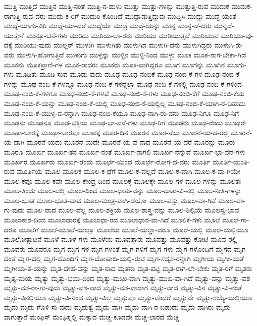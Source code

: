 {ಮುತ್ತಿ
ಮುತ್ತಿದೆ
ಮುತ್ತಿನ
ಮುತ್ತಿ-ನಂತೆ
ಮುತ್ತಿ-ನ-ಹುಳು
ಮುತ್ತು
ಮುತ್ತು-ಗಳನ್ನು
ಮುತ್ತುತ್ತಿ-ರುವ
ಮುದುಕ
ಮುದುಕ-ರಾಗುತ್ತಿ-ರುವ-ವರು
ಮುದು-ಕ-ರಿಗೆ
ಮುದುರಿ-ಕೊಂಡಿದೆ
ಮುದ್ದಾಡುತ್ತಿದ್ದುವು
ಮುದ್ದಿಸಿ
ಮುದ್ದು
ಮುದ್ದೆ-ಯಂತೆ
ಮುದ್ದೆ-ಯಾಗು-ವಿರಿ
ಮುದ್ದೆ-ಯಾ-ದರೆ
ಮುದ್ದೆಯೇ
ಮುದ್ರೆ
ಮುದ್ರೆ-ಯನ್ನು
ಮುನ್ನ
ಮುನ್ನ-ಡೆ-ದರು
ಮುನ್ನಡೆ-ಯುತ್ತೇನೆ
ಮುನ್ಸೂ-ಚನೆ-ಗಳು
ಮುರಿದು
ಮುರಿಯ-ಲಾ-ರರು
ಮುರಿಯು
ಮುರಿಯುತ್ತದೆ
ಮುರಿಯುವ
ಮುರಿಯು-ವು-ದಕ್ಕೆ
ಮುರಿಯು-ವುದು
ಮುಲ್ಲರ್
ಮುಳುಗಿ
ಮುಳುಗಿತು
ಮುಳುಗಿದ
ಮುಳುಗಿ-ದನು
ಮುಳುಗಿದ್ದರು
ಮುಳುಗಿ-ರು-ವರು
ಮುಳುಗಿ-ಹೋಗುತ್ತಿದೆ
ಮುಳುಗು
ಮುಳ್ಳನ್ನು
ಮುಳ್ಳಿನ
ಮುಳ್ಳಿ-ನಿಂದ
ಮುಳ್ಳು
ಮೂಕ
ಮೂಕ-ನಾಗ-ಬೇಕಾ-ಗಿದೆ
ಮೂಕನು
ಮೂಕಪ್ರಾಣಿ-ಗಳ
ಮೂಕ-ರಾದರು
ಮೂಕರು
ಮೂಕ-ವಾಗಿದ್ದರೂ
ಮೂಗ
ಮೂಗನ್ನು
ಮೂಗಿನ
ಮೂಗು-ಗಳು
ಮೂಡಿತು
ಮೂಡಿ-ಸುವ
ಮೂಡು-ವುದು
ಮೂಢ
ಮೂಢ-ನಂಬಿಕೆ
ಮೂಢ-ನಂಬಿ-ಕೆ-ಗಳ
ಮೂಢ-ನಂಬಿ-ಕೆ-ಗಳನ್ನು
ಮೂಢ-ನಂಬಿ-ಕೆ-ಗಳನ್ನೂ
ಮೂಢ-ನಂಬಿ-ಕೆ-ಗಳನ್ನೆಲ್ಲಾ
ಮೂಢ-ನಂಬಿ-ಕೆ-ಗಳಲ್ಲಿ
ಮೂಢ-ನಂಬಿ-ಕೆ-ಗಳಿಂದ
ಮೂಢ-ನಂಬಿ-ಕೆ-ಗಳಿಗೂ
ಮೂಢ-ನಂಬಿ-ಕೆ-ಗಳಿವೆ
ಮೂಢ-ನಂಬಿ-ಕೆ-ಗಳು
ಮೂಢ-ನಂಬಿ-ಕೆಗೆ
ಮೂಢ-ನಂಬಿ-ಕೆಯ
ಮೂಢ-ನಂಬಿ-ಕೆ-ಯನ್ನು
ಮೂಢ-ನಂಬಿ-ಕೆ-ಯಲ್ಲಿ
ಮೂಢ-ನಂಬಿ-ಕೆ-ಯಲ್ಲಿಲ್ಲ
ಮೂಢ-ನಂಬಿ-ಕೆ-ಯಾಗಿ-ರ-ಬಹುದು
ಮೂಢ-ನಂಬಿ-ಕೆ-ಯುಳ್ಳ-ವ-ರನ್ನಾಗಿ
ಮೂಢ-ನಂಬಿ-ಕೆಯೂ
ಮೂಢ-ನಾಗಿ-ರು-ವನು
ಮೂಢ-ನಿಗೂ
ಮೂಢ-ನಿಗೆ
ಮೂಢನು
ಮೂಢನೂ
ಮೂಢ-ಭಕ್ತಿಯ
ಮೂಢ-ಭಾ-ವನೆ-ಗಳು
ಮೂಢ-ರಿಗೆ
ಮೂಢರು
ಮೂಢ-ರೆಂದು
ಮೂಢರೇ
ಮೂಢಾ-ಚಾರಕ್ಕೆ
ಮೂಢಾ-ಚಾರವೂ
ಮೂರಕ್ಕೆ
ಮೂರ-ದಿನ
ಮೂರನೆ
ಮೂರ-ನೆಯ
ಮೂರನೆ-ಯ-ದ-ರಲ್ಲಿ
ಮೂರನೆ-ಯ-ದಾಗಿ
ಮೂರನೆ-ಯದು
ಮೂರನೆ-ಯದೇ
ಮೂರನೆ-ಯ-ವ-ನಾದ
ಮೂರನೆ-ಯ-ವರೆ
ಮೂರನ್ನು
ಮೂರು
ಮೂರೂ
ಮೂರ್ಖ
ಮೂರ್ಖ-ತನ
ಮೂರ್ಖ-ನಂತೆ
ಮೂರ್ಖ-ನಾಗಲಿ
ಮೂರ್ಖ-ನೆನ್ನುವೆ
ಮೂರ್ಖ-ಭಾ-ವನೆ-ಗಳು
ಮೂರ್ಖರ
ಮೂರ್ಖರು
ಮೂರ್ಖ-ರೆಂದು
ಮೂರ್ಛೆ-ಯಿಂದ
ಮೂರ್ಛೆ-ರೋಗ-ದ-ವರು
ಮೂರ್ತಿ
ಮೂರ್ತಿ-ಯಂತಿ-ರುವ
ಮೂರ್ತಿಯೆ
ಮೂಲ
ಮೂಲಕ
ಮೂಲ-ಕ-ಥೆಗೆ
ಮೂಲ-ಕ-ವಲ್ಲದೆ
ಮೂಲ-ಕ-ವಾಗಿ
ಮೂಲ-ಕ-ವಾ-ಗಿಯೇ
ಮೂಲ-ಕವೂ
ಮೂಲ-ಕವೇ
ಮೂಲ-ಕೇಂದ್ರ-ದಿಂದ
ಮೂಲಕ್ಕೆ
ಮೂಲಕ್ಕೇ
ಮೂಲ-ಗಳ
ಮೂಲ-ಗಳನ್ನು
ಮೂಲತಃ
ಮೂಲ-ತಿಂದು
ಮೂಲ-ದಲ್ಲಿ
ಮೂಲ-ದಿಂದ
ಮೂಲ-ಧಾತು-ವನ್ನು
ಮೂಲ-ಧಾತು-ವಿ-ನಲ್ಲಿ
ಮೂಲ-ನೀತಿ-ಗಳನ್ನು
ಮೂಲ-ಭೂತ
ಮೂಲ-ಭೂತ-ವಾದ
ಮೂಲ-ಮಂತ್ರ-ವಾಗಿ-ದೆಯೋ
ಮೂಲ-ವಸ್ತು
ಮೂಲ-ವಾ-ಗಿವೆ
ಮೂಲ-ವಾ-ಗು-ವುದು
ಮೂಲ-ವಾದ
ಮೂಲ-ವೆಲ್ಲ
ಮೂಲ-ಶಕ್ತಿಯ
ಮೂಲ-ಶಾಸ್ತ್ರ-ವನ್ನು
ಮೂಲ-ಶಿಲ್ಪಿಯೆ
ಮೂಲಸ್ವ-ಭಾವ
ಮೂಲಾಕಾಶ-ದಿಂದ
ಮೂಲಾಧಾರಕ್ಕೆ
ಮೂಲಾಧಾ-ರದ
ಮೂಲಾಧಾರ-ವಾ-ಗಿದೆ
ಮೂಲಿಕೆ-ಗಳು
ಮೂಲೆ
ಮೂಲೆ-ಗಾ-ದರೂ
ಮೂಲೆಗೆ
ಮೂಲೆ-ಮೂಲೆ-ಯಲ್ಲೂ
ಮೂಲೆಯ
ಮೂಲೆ-ಯಲ್ಲಾ-ದರೂ
ಮೂಲೆ-ಯಲ್ಲಿ
ಮೂಲೆ-ಯಲ್ಲಿಯೂ
ಮೂಲೋತ್ಪಾಟನೆ
ಮೂಳೆ
ಮೂಳೆ-ಗಳು
ಮೂಳೆಯ
ಮೂವತ್ತಾರು
ಮೂವತ್ತು
ಮೂವತ್ತು-ಕೋಟಿ
ಮೂವ-ರಲ್ಲಿ
ಮೂವರು
ಮೂವರೂ
ಮೃಗ
ಮೃಗ-ಗಳ
ಮೃಗ-ಗಳಂತೆ
ಮೃಗ-ಗಳಿಗೆ
ಮೃಗ-ಗಳು
ಮೃಗ-ಗಳೊಂದಿಗೆ
ಮೃಗದ
ಮೃಗ-ದಂತೆ
ಮೃಗ-ದಲ್ಲಿ
ಮೃಗ-ದೊಂದಿಗೆ
ಮೃಗ-ದೋಪಾದಿ-ಯಲ್ಲಿ-ರುವ
ಮೃಗ-ಸದೃಶ-ರನ್ನಾಗಿ
ಮೃಗೀಯ
ಮೃಗೀ-ಯತೆ
ಮೃಗೀಯ-ತೆ-ಯನ್ನು
ಮೃತ-ದೇಹ-ವನ್ನು
ಮೃತ-ನಾದ
ಮೃತನು
ಮೃತ-ಪಟ್ಟ
ಮೃತ-ರಾಗ-ಲೇ-ಬೇಕು
ಮೃತ-ರಿಗೆ
ಮೃತರು
ಮೃತ್ಯ-ಮಯ
ಮೃತ್ಯು
ಮೃತ್ಯು-ಭಯ-ದಿಂದ
ಮೃತ್ಯು-ಮುಖ-ವಾಗಿ
ಮೃತ್ಯು-ಮುಖ-ವಾ-ಗಿದೆ
ಮೃತ್ಯು-ವನ್ನು
ಮೃತ್ಯು-ವಶ
ಮೃತ್ಯು-ವಶ-ರಾ-ಗು-ವುದು
ಮೃತ್ಯು-ವಶ-ವಾದ
ಮೃತ್ಯು-ವಶ-ವಾದಾಗ
ಮೃತ್ಯು-ವಾದ
ಮೃತ್ಯು-ವಿನ
ಮೃತ್ಯು-ವಿ-ನಂತೆ
ಮೃತ್ಯು-ವಿನಲ್ಲಿಯೂ
ಮೃತ್ಯು-ವಿ-ನಿಂದ
ಮೃತ್ಯು-ವಿಲ್ಲ
ಮೃತ್ಯುವೂ
ಮೃತ್ಯು-ವೆಂದರೆ
ಮೃತ್ಯುವೇ
ಮೃತ್ಯು-ಶಯ್ಯೆ-ಯಲ್ಲಿಯೂ
ಮೃದು
ಮೃದು-ಗೊಳಿ-ಸು-ವುದು
ಮೃದುತ್ವ
ಮೃದು-ವಾಗಿ
ಮೃದು-ವಾಗಿ-ರ-ಬಹುದು
ಮೃದು-ವಾಗಿರು
ಮೃದು-ವಾಗುತ್ತಾನೆ
ಮೆಂಫಿಸ್
ಮೆಂಫಿಸ್ನಲ್ಲಿ
ಮೆಕ್ಕಾದ
ಮೆಚ್ಚ-ಕೂಡದೇ
ಮೆಚ್ಚ-ಲಾರದ
ಮೆಚ್ಚಿ
}
